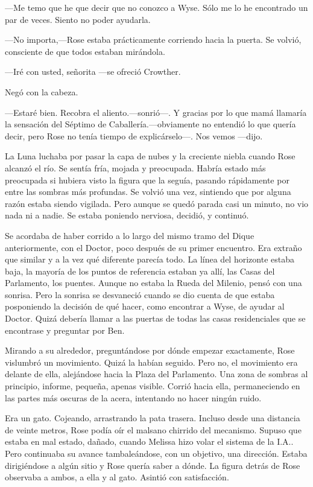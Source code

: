 {---Me temo que he que decir que no conozco a Wyse. Sólo me lo he
encontrado un par de veces. Siento no poder ayudarla.}

{---No importa,---Rose estaba prácticamente corriendo hacia la puerta.
Se volvió, consciente de que todos estaban mirándola.}

{---Iré con usted, señorita ---se ofreció Crowther.}

{Negó con la cabeza.}

{---Estaré bien. Recobra el aliento.---sonrió---. Y gracias por lo que
	mamá llamaría la sensación del Séptimo de Caballería.---obviamente no
	entendió lo que quería decir, pero Rose no tenía tiempo de
explicárselo---. Nos vemos ---dijo.}

\mbox{}

{La Luna luchaba por pasar la capa de nubes y la creciente niebla cuando
	Rose alcanzó el río. Se sentía fría, mojada y preocupada. Habría estado
	más preocupada si hubiera visto la figura que la seguía, pasando
	rápidamente por entre las sombras más profundas. Se volvió una vez,
	sintiendo que por alguna razón estaba siendo vigilada. Pero aunque se
	quedó parada casi un minuto, no vio nada ni a nadie. Se estaba poniendo
nerviosa, decidió, y continuó.}

{Se acordaba de haber corrido a lo largo del mismo tramo del Dique
	anteriormente, con el Doctor, poco después de su primer encuentro. Era
	extraño que similar y a la vez qué diferente parecía todo. La línea del
	horizonte estaba baja, la mayoría de los puntos de referencia estaban ya
	allí, las Casas del Parlamento, los puentes. Aunque no estaba la Rueda
	del Milenio, pensó con una sonrisa. Pero la sonrisa se desvaneció cuando
	se dio cuenta de que estaba posponiendo la decisión de qué hacer, como
	encontrar a Wyse, de ayudar al Doctor. Quizá debería llamar a las
	puertas de todas las casas residenciales que se encontrase y preguntar
por Ben.}

{Mirando a su alrededor, preguntándose por dónde empezar exactamente,
	Rose vislumbró un movimiento. Quizá la habían seguido. Pero no, el
	movimiento era delante de ella, alejándose hacia la Plaza del
	Parlamento. Una zona de sombras al principio, informe, pequeña, apenas
	visible. Corrió hacia ella, permaneciendo en las partes más oscuras de
la acera, intentando no hacer ningún ruido.}

{Era un gato. Cojeando, arrastrando la pata trasera. Incluso desde una
	distancia de veinte metros, Rose podía oír el malsano chirrido del
	mecanismo. Supuso que estaba en mal estado, dañado, cuando Melissa hizo
	volar el sistema de la I.A.. Pero continuaba su avance tambaleándose,
	con un objetivo, una dirección. Estaba dirigiéndose a algún sitio y Rose
	quería saber a dónde. La figura detrás de Rose observaba a ambos, a ella
y al gato. Asintió con satisfacción.}

